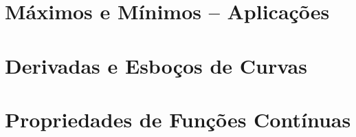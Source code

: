 \section{Máximos e Mínimos -- Aplicações}
\label{sec:maxminappl}

\section{Derivadas e Esboços de Curvas}
\label{sec:derivsketch}

\section{Propriedades de Funções Contínuas}
\label{sec:propcont}

\begin{chapterproblems}
\end{chapterproblems}
